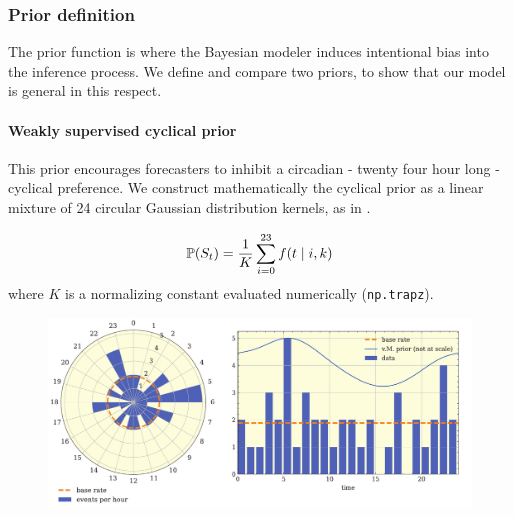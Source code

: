 \subsubsection{Prior definition}
The prior function is where the Bayesian modeler induces intentional bias into the inference process. We define and compare two priors, to show that our model is general in this respect.

\paragraph{Weakly supervised cyclical prior}
This prior encourages forecasters to inhibit a circadian - twenty four hour long - cyclical preference. We construct mathematically the cyclical prior as a linear mixture of 24 circular Gaussian distribution kernels, as in \cite{karoly2017circadian}.



\begin{definition}
    \begin{equation}
    \label{eq:c3bsle:cyclical_prior}
    \mathbb{P}(S_t) = \frac{1}{K}\sum_{i=0}^{23} f(t \mid i, k)
    \end{equation}
    where $K$ is a normalizing constant evaluated numerically (\texttt{np.trapz}).
\end{definition}

\begin{figure}[h]
    \includegraphics[width=\textwidth]{c3Bsle/Figs/prior/vm_prior_histogram.pdf}
    \label{fig:c3bsle:circadian_hist_vm}
\end{figure}

